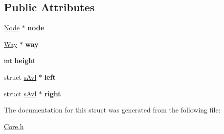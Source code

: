 \subsection*{Public Attributes}
\begin{DoxyCompactItemize}
\item 
\hypertarget{structsAvl_a86e4262b6dcb6d69a23274064a90c2c7}{\hyperlink{structNode}{Node} $\ast$ {\bfseries node}}\label{structsAvl_a86e4262b6dcb6d69a23274064a90c2c7}

\item 
\hypertarget{structsAvl_a1f65b88ea657e036d81dd9587b1f7566}{\hyperlink{structWay}{Way} $\ast$ {\bfseries way}}\label{structsAvl_a1f65b88ea657e036d81dd9587b1f7566}

\item 
\hypertarget{structsAvl_a1678d05e6984326e3f25002f9b5d4ac9}{int {\bfseries height}}\label{structsAvl_a1678d05e6984326e3f25002f9b5d4ac9}

\item 
\hypertarget{structsAvl_a97ab2166bf624b8cc03c6a02ba46ea9d}{struct \hyperlink{structsAvl}{s\-Avl} $\ast$ {\bfseries left}}\label{structsAvl_a97ab2166bf624b8cc03c6a02ba46ea9d}

\item 
\hypertarget{structsAvl_a251c789fc0532eae2b7a6fadd64d39a4}{struct \hyperlink{structsAvl}{s\-Avl} $\ast$ {\bfseries right}}\label{structsAvl_a251c789fc0532eae2b7a6fadd64d39a4}

\end{DoxyCompactItemize}


The documentation for this struct was generated from the following file\-:\begin{DoxyCompactItemize}
\item 
\hyperlink{Core_8h}{Core.\-h}\end{DoxyCompactItemize}
